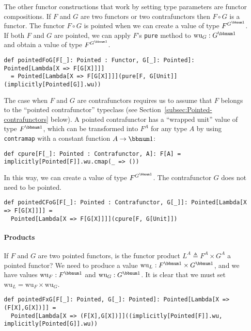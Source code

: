 The other functor constructions that work by setting type parameters
are functor compositions. If $F$ and $G$ are two functors or two
contrafunctors then $F\circ G$ is a functor. The functor $F\circ G$
is pointed when we can create a value of type $F^{G^{\bbnum 1}}$.
If both $F$ and $G$ are pointed, we can apply $F$'s \lstinline!pure!
method to $\text{wu}_{G}:G^{\bbnum 1}$ and obtain a value of type
$F^{G^{\bbnum 1}}$.
\begin{lstlisting}
def pointedFoG[F[_]: Pointed : Functor, G[_]: Pointed]: Pointed[Lambda[X => F[G[X]]]]
  = Pointed[Lambda[X => F[G[X]]]](pure[F, G[Unit]](implicitly[Pointed[G]].wu))     
\end{lstlisting}
The case when $F$ and $G$ are contrafunctors requires us to assume
that $F$ belongs to the ``pointed contrafunctor'' typeclass (see
Section~\ref{subsec:Pointed-contrafunctors} below). A pointed contrafunctor
has a ``wrapped unit'' value of type $F^{\bbnum 1}$, which can
be transformed into $F^{A}$ for any type $A$ by using \lstinline!contramap!
with a constant function $A\rightarrow\bbnum 1$:
\begin{lstlisting}
def cpure[F[_]: Pointed : Contrafunctor, A]: F[A] = implicitly[Pointed[F]].wu.cmap(_ => ())
\end{lstlisting}
In this way, we can create a value of type $F^{G^{\bbnum 1}}$. The
contrafunctor $G$ does not need to be pointed.
\begin{lstlisting}
def pointedCFoG[F[_]: Pointed : Contrafunctor, G[_]]: Pointed[Lambda[X => F[G[X]]]] =
  Pointed[Lambda[X => F[G[X]]]](cpure[F, G[Unit]])
\end{lstlisting}


\paragraph{Products}

If $F$ and $G$ are two pointed functors, is the functor product
$L^{A}\triangleq F^{A}\times G^{A}$ a pointed functor? We need to
produce a value $\text{wu}_{L}:F^{\bbnum 1}\times G^{\bbnum 1}$,
and we have values $\text{wu}_{F}:F^{\bbnum 1}$ and $\text{wu}_{G}:G^{\bbnum 1}$.
It is clear that we must set $\text{wu}_{L}=\text{wu}_{F}\times\text{wu}_{G}$.
\begin{lstlisting}
def pointedFxG[F[_]: Pointed, G[_]: Pointed]: Pointed[Lambda[X => (F[X],G[X])]] =
  Pointed[Lambda[X => (F[X],G[X])]]((implicitly[Pointed[F]].wu, implicitly[Pointed[G]].wu))
\end{lstlisting}


